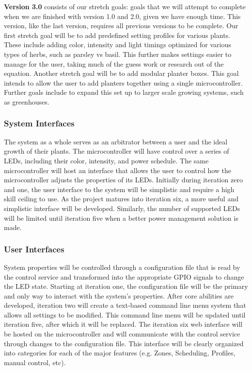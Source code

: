 		\noindent \textbf{Version 3.0} consists of our stretch goals: goals that we will attempt to complete when we are finished with version 1.0 and 2.0, given we have enough time. This version, like the last version,
		requires all previous versions to be complete. Our first stretch goal will be to add predefined setting profiles for various plants. These include adding color, intensity and light timings optimized
		for various types of herbs, such as parsley vs basil. This further makes settings easier to manage for the user, taking much of the guess work or research out of the equation. Another stretch goal will be
		to add modular planter boxes. This goal intends to allow the user to add planters together using a single microcontroller. Further goals include to expand this set up to larger scale growing systems,
		such as greenhouses.


		\subsubsection{System Interfaces}
				The system as a whole serves as an arbitrator between a user and the ideal growth of their plants.
				The microcontroller will have control over a series of LEDs, including their color, intensity, and power schedule. The same microcontroller will host an interface that allows the user to control
				how the microcontroller adjusts the properties of its LEDs. Initially during iteration zero and one, the user interface to the system will be simplistic and require a high skill ceiling to use. As the project matures into iteration six, a more useful and
				simplistic interface will be developed. Similarly, the number of supported LEDs will be limited until iteration five when a better power management solution is made.
		 \subsubsection{User Interfaces}
				System properties will be controlled through a configuration file that is read by the control service and transformed into the appropriate GPIO signals to change the LED state. Starting at
				iteration one, the configuration file will be the primary and only way to interact with the system's properties. After core abilities are developed, iteration two will create a text-based command
				line menu system that allows all settings to be modified. This command line menu will be updated until iteration five, after which it will be replaced.
				The iteration six web interface will be hosted on the microcontroller and will communicate with the control service through changes to the configuration file. This interface will be clearly
				organized into categories for each of the major features (e.g. Zones, Scheduling, Profiles, manual control, etc).
